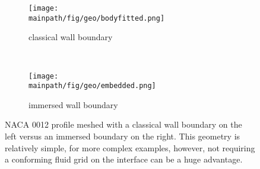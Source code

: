 \documentclass[../main.tex]{subfiles}
\begin{document}
\begin{figure}
\centering
			    \begin{subfigure}[t]{0.4\textwidth}
			        \centering
			        \texttt{[image: \\mainpath/fig/geo/bodyfitted.png]}
			        \caption{classical wall boundary}
			    \end{subfigure}~
			    	\begin{subfigure}[t]{0.4\textwidth}
			        \centering
			        \texttt{[image: \\mainpath/fig/geo/embedded.png]}
			        \caption{immersed wall boundary}
			    \end{subfigure}%
\caption[Body-fitted vs. immersed wall boundary]{NACA 0012 profile meshed with a classical wall boundary on the left versus an immersed boundary on the right. This geometry is relatively simple, for more complex examples, however, not requiring a conforming fluid grid on the interface can be a huge advantage.}
\label{fig:ale_vs_embedded}
\end{figure}
\end{document}
